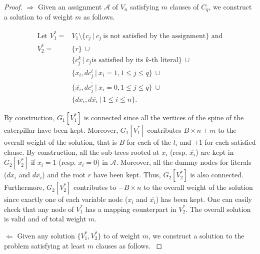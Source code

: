 		\begin{proof}
		{\parindent0pt
		$\boxed{\Rightarrow}$ Given} an assignment $\mathcal{A}$ of $V_n$ satisfying $m$ clauses of $C_q$, we construct a solution to \mwccs{} of weight $m$ as follows.

		\begin{align*}
		\text{Let }V_1^*= &V_1 \setminus \{c_j ~\vert~ c_j\ \text{is not satisfied by the assignment}\}\text{ and}\\
		V_2^*= & \{r\} ~\cup \\
		& \{c^k_j ~\vert~ c_j \text{is satisfied by its } k\text{-th literal}\}  ~ \cup \\
		& \{x_i, dc^i_j ~\vert~ x_i=1, 1 \leq j \leq q\} ~\cup \\
		& \{\overline{x_i}, dc^{\overline{i}}_j ~\vert~ x_i=0, 1 \leq j \leq q\} ~\cup \\
		& \{dx_i,d\overline{x_i} ~\vert~ 1 \leq i \leq n\}.
		\end{align*}

		By construction, $G_1[V_1^*]$ is connected since all the vertices of the spine of the caterpillar have been kept. Moreover, $G_1[V_1^*]$ contributes $B \times n+m$ to the overall weight of the solution, that is $B$ for each of the $l_i$ and $+1$ for each satisfied clause.
		By construction, all the sub-trees rooted at $x_i$ (resp. $\overline{x_i}$) are kept in $G_2[V_2^*]$ if $x_i=1$ (resp. $x_i=0$) in $\mathcal{A}$. Moreover, all the dummy nodes for literals ($dx_i$ and $d\overline{x_i}$) and the root $r$ have been kept. Thus, $G_2[V_2^*]$ is also connected.
		Furthermore, $G_2[V_2^*]$ contributes to $-B\times n$ to the overall weight of the solution since exactly one of each variable node ($x_i$ and $\overline{x_i}$) has been kept. 
		One can easily check that any node of $V_1^*$ has a mapping counterpart in $V_2^*$. The overall solution is valid and of total weight $m$.

		\vspace*{1em}
		{\parindent0pt
		$\boxed{\Leftarrow}$ Given any solution $\{V_1^*,V_2^*\}$ to \mwccs{} of weight $m$, we construct a solution to the \msat{} problem satisfying at least $m$ clauses as follows.
		}


\end{proof}
